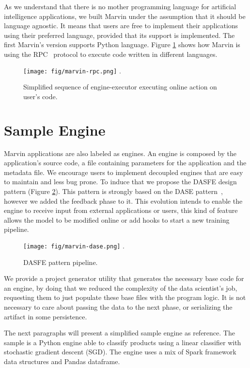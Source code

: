 \documentclass[twoside,11pt]{article}
\begin{document}
As we understand that there is no mother programming language for artificial intelligence applications, we built Marvin under the assumption that it should be language agnostic. It means that users are free to implement their applications using their preferred language, provided that its support is implemented. The first Marvin's version supports Python language. Figure \ref{fig_rpc} shows how Marvin is using the RPC~\citep{srinivasan1995rpc} protocol to execute code written in different languages.

\begin{figure}[h]
\centering
\texttt{[image: fig/marvin-rpc.png]}
\DeclareGraphicsExtensions.
\caption{Simplified sequence of engine-executor executing online action on user's code.}
\label{fig_rpc}
\end{figure}

\section{Sample Engine}

Marvin applications are also labeled as engines. An engine is composed by the application's source code, a file containing parameters for the application and the metadata file. We encourage users to implement decoupled engines that are easy to maintain and less bug prone. To induce that we propose the DASFE design pattern (Figure \ref{fig_dase}). This pattern is strongly based on the DASE pattern~\citep{chan2013predictionio}, however we added the feedback phase to it. This evolution intends to enable the engine to receive input from external applications or users, this kind of feature allows the model to be modified online or add hooks to start a new training pipeline.

\begin{figure}[h]
\centering
\texttt{[image: fig/marvin-dase.png]}
\DeclareGraphicsExtensions.
\caption{DASFE pattern pipeline.}
\label{fig_dase}
\end{figure}

We provide a project generator utility that generates the necessary base code for an engine, by doing that we reduced the complexity of the data scientist's job, requesting them to just populate these base files with the program logic. It is not necessary to care about passing the data to the next phase, or serializing the artifact in some persistence. 

The next paragraphs will present a simplified sample engine as reference. The sample is a Python engine able to classify products using a linear classifier with stochastic gradient descent (SGD). The engine uses a mix of Spark framework data structures and Pandas dataframe.
\end{document}
